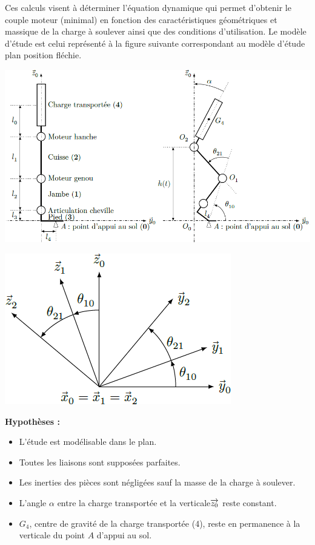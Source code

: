 \documentclass[10pt,fleqn]{article} %
\begin{document}
\begin{multicols}{2}
Ces calculs visent à déterminer l’équation dynamique qui permet d’obtenir le couple moteur (minimal) en fonction des caractéristiques géométriques et massique de la charge à soulever ainsi que des conditions d’utilisation.
Le modèle d’étude est celui représenté à la figure suivante correspondant au modèle d’étude plan position fléchie.
\begin{center}
\includegraphics[width=\linewidth]{images/fig_03}
\end{center}

\begin{center}
\includegraphics[width=.7\linewidth]{images/fig_14}
\end{center}


\noindent\textbf{Hypothèses :}
\begin{itemize}
\item L’étude est modélisable dans le plan.
\item Toutes les liaisons sont supposées parfaites.
\item Les inerties des pièces sont négligées sauf la masse de la charge à soulever.
\item L’angle $\alpha$ entre la charge transportée et la verticale$\overrightarrow{z_0}$ reste constant.
\item $G_4$, centre de gravité de la charge transportée (4), reste en permanence à la verticale du point $A$ d’appui au sol.
\end{itemize}


\end{multicols}
\end{document}

